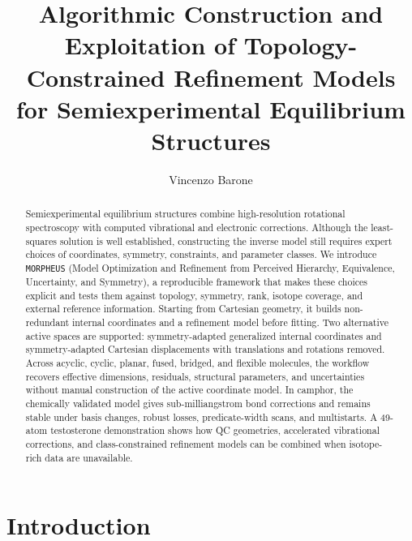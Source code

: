 \documentclass[aip,jcp,reprint,longbibliography,floatfix]{revtex4-2}
\newcommand{\revabstract}[1]{#1}
\begin{document}
\title{Algorithmic Construction and Exploitation of Topology-Constrained Refinement Models for Semiexperimental Equilibrium Structures}

\author{Vincenzo Barone}

\begin{abstract}
\revabstract{Semiexperimental equilibrium structures combine high-resolution rotational spectroscopy with computed vibrational and electronic corrections. Although the least-squares solution is well established, constructing the inverse model still requires expert choices of coordinates, symmetry, constraints, and parameter classes. We introduce \texttt{MORPHEUS} (Model Optimization and Refinement from Perceived Hierarchy, Equivalence, Uncertainty, and Symmetry), a reproducible framework that makes these choices explicit and tests them against topology, symmetry, rank, isotope coverage, and external reference information. Starting from Cartesian geometry, it builds non-redundant internal coordinates and a refinement model before fitting. Two alternative active spaces are supported: symmetry-adapted generalized internal coordinates and symmetry-adapted Cartesian displacements with translations and rotations removed. Across acyclic, cyclic, planar, fused, bridged, and flexible molecules, the workflow recovers effective dimensions, residuals, structural parameters, and uncertainties without manual construction of the active coordinate model. In camphor, the chemically validated model gives sub-milliangstrom bond corrections and remains stable under basis changes, robust losses, predicate-width scans, and multistarts. A 49-atom testosterone demonstration shows how QC geometries, accelerated vibrational corrections, and class-constrained refinement models can be combined when isotope-rich data are unavailable.}

\end{abstract}


\maketitle


\section{Introduction}
\end{document}
